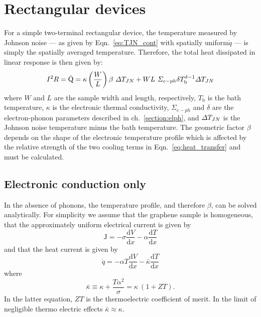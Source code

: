 \section{Rectangular devices}\label{section:retangularDeviceJN}
For a simple two-terminal rectangular device, the temperature measured by Johnson noise --- as given by Eqn.~\ref{eq:TJN_cont} with spatially uniform$\dot{q}$ --- is simply the spatially averaged temperature. Therefore, the total heat dissipated in linear response is then given by:
\begin{equation}\label{eq:heat_transfer}
I^2R = \dot{\mathrm{Q}} = \kappa\left(\frac{W}{L}\right)\beta~\Delta T_{JN} + WL~\Sigma_{e-ph}\delta T_\mathrm{b}^{\delta-1}\Delta T_{JN}
\end{equation}
where $W$ and $L$ are the sample width and length, respectively, $T_\mathrm{b}$ is the bath temperature, $\kappa$ is the electronic thermal conductivity, $\Sigma_{e-ph}$ and $\delta$ are the electron-phonon parameters described in ch.~\ref{section:elph}, and $\Delta T_{JN}$ is the Johnson noise temperature minus the bath temperature. The geometric factor $\beta$ depends on the shape of the electronic temperature profile which is affected by the relative strength of the two cooling terms in Eqn.~\ref{eq:heat_transfer} and must be calculated.

\subsection{Electronic conduction only}
In the absence of phonons, the temperature profile, and therefore $\beta$, can be solved analytically. For simplicity we assume that the graphene sample is homogeneous, that the approximately uniform electrical current is given by 
\begin{equation}
\mathrm{J} = -\sigma \frac{\mathrm{d}V}{\mathrm{d}x} - \alpha \frac{\mathrm{d}T}{\mathrm{d}x}
\end{equation}
and that the heat current is given by \begin{equation}
\dot{q} = -\alpha T\frac{\mathrm{d}V}{\mathrm{d}x} - \bar\kappa \frac{\mathrm{d}T}{\mathrm{d}x}
\end{equation}
where
\begin{equation}
\bar\kappa \equiv \kappa + \frac{T\alpha^2}{\sigma} = \kappa~(1+ZT).
\end{equation}
In the latter equation,  $ZT$ is the thermoelectric coefficient of merit. In the limit of negligible thermo electric effects $\bar\kappa\approx\kappa$. 

